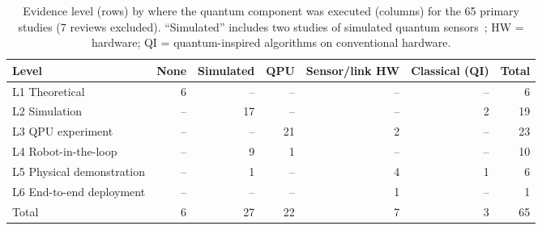 \documentclass[acmsmall,screen,review]{acmart}
\begin{document}
\begin{table}[tbp]
\caption{Evidence level (rows) by where the quantum component was executed (columns) for the 65 primary studies (7 reviews excluded). ``Simulated'' includes two studies of simulated quantum sensors~\cite{Wang2021,Wang2023}; HW = hardware; QI = quantum-inspired algorithms on conventional hardware.}
\label{tab:execution}
\footnotesize
\begin{tabular}{@{}lrrrrrr@{}}
\toprule
\textbf{Level} & \textbf{None} & \textbf{Simulated} & \textbf{QPU} & \textbf{Sensor/link HW} & \textbf{Classical (QI)} & \textbf{Total} \\ \midrule
L1 Theoretical & 6 & -- & -- & -- & -- & 6 \\
L2 Simulation & -- & 17 & -- & -- & 2 & 19 \\
L3 QPU experiment & -- & -- & 21 & 2 & -- & 23 \\
L4 Robot-in-the-loop & -- & 9 & 1 & -- & -- & 10 \\
L5 Physical demonstration & -- & 1 & -- & 4 & 1 & 6 \\
L6 End-to-end deployment & -- & -- & -- & 1 & -- & 1 \\ \midrule
Total & 6 & 27 & 22 & 7 & 3 & 65 \\
\bottomrule
\end{tabular}
\end{table}
\end{document}
